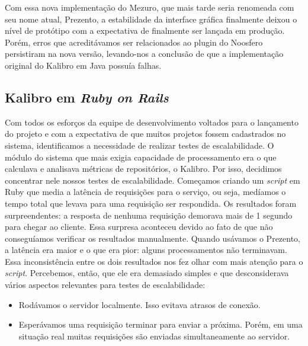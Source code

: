 \documentclass{llncs}
\begin{document}
  Com essa nova implementação do Mezuro, que mais tarde seria renomeada com seu nome atual, Prezento, a estabilidade da interface gráfica finalmente deixou o nível de protótipo com a expectativa de finalmente ser lançada em produção. Porém, erros que acreditávamos ser relacionados ao plugin do Noosfero persistiram na nova versão, levando-nos a conclusão de que a implementação original do Kalibro em Java possuía falhas.

  \subsection{Kalibro em \textit{Ruby on Rails}}
  Com todos os esforços da equipe de desenvolvimento voltados para o lançamento do projeto e com a expectativa de que muitos projetos fossem cadastrados no sistema, identificamos a necessidade de realizar testes de escalabilidade. O módulo do sistema que mais exigia capacidade de processamento era o que calculava e analisava métricas de repositórios, o Kalibro. Por isso, decidimos concentrar nele nossos testes de escalabilidade.
  Começamos criando um \textit{script} em Ruby que media a latência de requisições para o serviço, ou seja, medíamos o tempo total que levava para uma requisição ser respondida. Os resultados foram surpreendentes: a resposta de nenhuma requisição demorava mais de 1 segundo para chegar ao cliente. Essa surpresa aconteceu devido ao fato de que não conseguíamos verificar os resultados manualmente. Quando usávamos o Prezento, a latência era maior e o que era pior: alguns processamentos não terminavam. Essa inconsistência entre os dois resultados nos fez olhar com mais atenção para o \textit{script}. Percebemos, então, que ele era demasiado simples e que desconsiderava vários aspectos relevantes para testes de escalabilidade:
  \begin{itemize}
    \item Rodávamos o servidor localmente. Isso evitava atrasos de conexão.
    \item Esperávamos uma requisição terminar para enviar a próxima. Porém, em uma situação real muitas requisições são enviadas simultaneamente ao servidor.
  \end{itemize}
\end{document}
